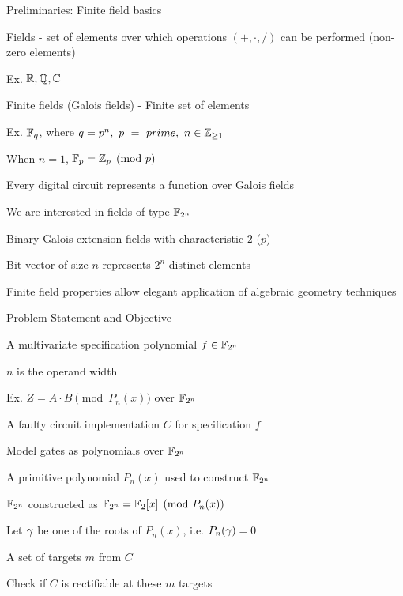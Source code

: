 \begin{frame}{\large Preliminaries: Finite field basics}
\bi
	\item Fields - set of elements over which operations $(+,\cdot,/)$ can be performed (non-zero elements)
	\bi
		\item Ex. ${\mathbb{R}},{\mathbb{Q}},{\mathbb{C}}$
	\ei
	\vspace{0.1in}
	\item Finite fields (Galois fields) - Finite set of elements
	\bi
		\item Ex. ${\mathbb{F}}_q$, where $q=p^n,~p~=~prime,~n \in {\mathbb{Z}}_{\geq 1}$ 
		\bi
		\item When $n=1$, ${\mathbb{F}}_p = {\mathbb{Z}}_p \pmod{p}$
		\ei
		\item Every digital circuit represents a function over Galois fields
	\ei
	\vspace{0.1in}
	\item We are interested in fields of type ${\mathbb{F}}_{2^n}$
	\bi
		\item Binary Galois extension fields with characteristic $2$ ($p$)
		\bi
			\item Bit-vector of size $n$ represents $2^n$ distinct elements
		\ei
		\item Finite field properties allow elegant application of algebraic geometry techniques
	\ei
\ei
\end{frame}

\begin{frame}{\large Problem Statement and Objective}
\bi
	\item A multivariate specification polynomial $f \in {\mathbb{F}}_{2^n}$
	\bi
		\item $n$ is the operand width
		\item Ex. $Z = A \cdot B \pmod{P_n(x)}$ over ${\mathbb{F}}_{2^n}$
	\ei 
	\vspace{0.1in}
	\item A faulty circuit implementation $C$ for specification $f$ 
	\bi
		\item Model gates as polynomials over ${\mathbb{F}}_{2^n}$
	\ei
	\vspace{0.1in}
	\item A primitive polynomial $P_n(x)$ used to construct ${\mathbb{F}}_{2^n}$
	\bi
		\item ${\mathbb{F}}_{2^n}$ constructed as ${\mathbb{F}}_{2^n} = {\mathbb{F}}_2[x] \pmod{ P_n(x)}$
		\item Let $\gamma$ be one of the roots of $P_n(x)$, i.e. $P_n(\gamma) = 0$
	\ei
	\vspace{0.1in}
	\item A set of targets $m$ from $C$
	\vspace{0.1in}
	\vspace{0.1in}
	\item Check if $C$ is rectifiable at these $m$ targets 


\ei
\end{frame}

